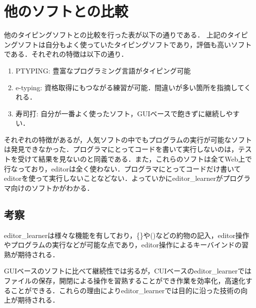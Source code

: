 \chapter{他のソフトとの比較}\label{ux4ed6ux306eux30bdux30d5ux30c8ux3068ux306eux6bd4ux8f03}
他のタイピングソフトとの比較を行った表が以下の通りである．
上記のタイピングソフトは自分もよく使っていたタイピングソフトであり，評価も高いソフトである．それぞれの特徴は以下の通り．

\begin{enumerate}
\def\labelenumi{\arabic{enumi}.}
\tightlist
\item
PTYPING: 豊富なプログラミング言語がタイピング可能
\item
e-typing: 資格取得にもつながる練習が可能．間違いが多い箇所を指摘してくれる．
\item
寿司打: 自分が一番よく使ったソフト，GUIベースで飽きずに継続しやすい．
\end{enumerate}

それぞれの特徴があるが，人気ソフトの中でもプログラムの実行が可能なソフトは発見できなかった．プログラマにとってコードを書いて実行しないのは，テストを受けて結果を見ないのと同義である．また，これらのソフトは全てWeb上で行なっており，editorは全く使わない．プログラマにとってコードだけ書いてeditorを使って実行しないことなどない．よっていかにeditor\_learnerがプログラマ向けのソフトかがわかる．

\section{考察}\label{ux8003ux5bdf}

editor\_learnerは様々な機能を有しており，\{\}や()などの約物の記入，editor操作やプログラムの実行などが可能な点であり，editor操作によるキーバインドの習熟が期待される．

GUIベースのソフトに比べて継続性では劣るが，CUIベースのeditor\_learnerではファイルの保存，開閉による操作を習熟することができ作業を効率化，高速化することができる．これらの理由によりeditor\_learnerでは目的に沿った技術の向上が期待される．

    
